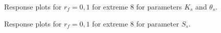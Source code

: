 \documentclass[review,times,3p,10pt]{elsarticle}
\begin{document}
\begin{figure}[htb!]
\label{ext6rf0-Kt3}
\caption{Response plots for $r_f=0,1$ for extreme 8 for parameters $K_s$ and $\theta_s$. }
\end{figure}

\begin{figure}[htb!]
\label{ext6rf0-Ss3}
\caption{Response plots for $r_f=0,1$ for extreme 8 for parameter $S_s$.}
\end{figure}
\end{document}
